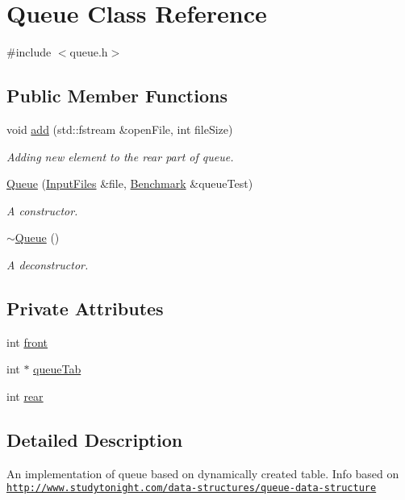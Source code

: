 \hypertarget{class_queue}{}\section{Queue Class Reference}
\label{class_queue}


{\ttfamily \#include $<$queue.\+h$>$}

\subsection*{Public Member Functions}
\begin{DoxyCompactItemize}
\item 
void \hyperlink{class_queue_a906083f1eae7bc4efb1e4ac04684f83a}{add} (std\+::fstream \&open\+File, int file\+Size)
\begin{DoxyCompactList}\small\item\em Adding new element to the rear part of queue. \end{DoxyCompactList}\item 
\hyperlink{class_queue_a435084ac15aec95620f6fee2198174bf}{Queue} (\hyperlink{class_input_files}{Input\+Files} \&file, \hyperlink{class_benchmark}{Benchmark} \&queue\+Test)
\begin{DoxyCompactList}\small\item\em A constructor. \end{DoxyCompactList}\item 
\hyperlink{class_queue_a00d119db8fa3050da37746e82cbcf94f}{$\sim$\+Queue} ()
\begin{DoxyCompactList}\small\item\em A deconstructor. \end{DoxyCompactList}\end{DoxyCompactItemize}
\subsection*{Private Attributes}
\begin{DoxyCompactItemize}
\item 
int \hyperlink{class_queue_a6d40dfb591ad9ff13fd1084b9e1eb0d5}{front}
\item 
int $\ast$ \hyperlink{class_queue_a8e206ea3eba2e59137f36b4425761a1d}{queue\+Tab}
\item 
int \hyperlink{class_queue_ac09196d6d91d62b8547bae02ae9063c5}{rear}
\end{DoxyCompactItemize}


\subsection{Detailed Description}
An implementation of queue based on dynamically created table. Info based on \href{http://www.studytonight.com/data-structures/queue-data-structure}{\tt http\+://www.\+studytonight.\+com/data-\/structures/queue-\/data-\/structure} 

